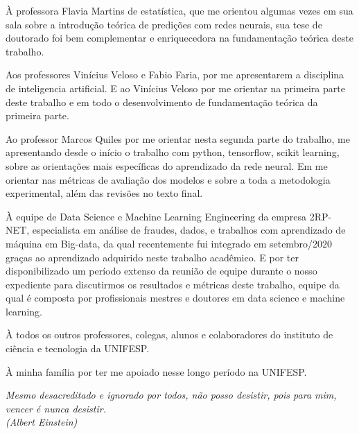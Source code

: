\documentclass[	12pt, Times, openright, twoside, a4paper, english, brazil]{abntex2}
\begin{document}
\begin{agradecimentos}
            À professora Flavia Martins de estatística, que me orientou algumas vezes em sua sala sobre a introdução teórica de predições com redes neurais, sua tese de doutorado foi bem complementar e enriquecedora na fundamentação teórica deste trabalho.\newline
            
            Aos professores Vinícius Veloso e Fabio Faria, por me apresentarem a disciplina de inteligencia artificial. E ao Vinícius Veloso por me orientar na primeira parte deste trabalho e em todo o desenvolvimento de fundamentação teórica da primeira parte.\newline
            
            Ao professor Marcos Quiles por me orientar nesta segunda parte do trabalho, me apresentando desde o início o trabalho com python, tensorflow, scikit learning, sobre as orientações mais específicas do aprendizado da rede neural. Em me orientar nas métricas de avaliação dos modelos e sobre a toda a metodologia experimental, além das revisões no texto final.\newline
            
            À equipe de Data Science e Machine Learning Engineering da empresa 2RP-NET, especialista em análise de fraudes, dados, e trabalhos com aprendizado de máquina em Big-data, da qual recentemente fui integrado em setembro/2020 graças ao aprendizado adquirido neste trabalho acadêmico. E por ter disponibilizado um período extenso da reunião de equipe durante o nosso expediente para discutirmos os resultados e métricas deste trabalho, equipe da qual é composta por profissionais mestres e doutores em data science e machine learning.\newline
            
            À todos os outros professores, colegas, alunos e colaboradores do instituto de ciência e tecnologia da UNIFESP.\newline
                
            À minha família por ter me apoiado nesse longo período na UNIFESP.\newline

    \end{agradecimentos}

    \begin{epigrafe}
        \vspace*{\fill}
    	\begin{flushright}
    		\textit{Mesmo desacreditado e ignorado por todos, não posso desistir, pois para mim, vencer é nunca desistir.\\
    		(Albert Einstein)}
    	\end{flushright}
    \end{epigrafe}
\end{document}
